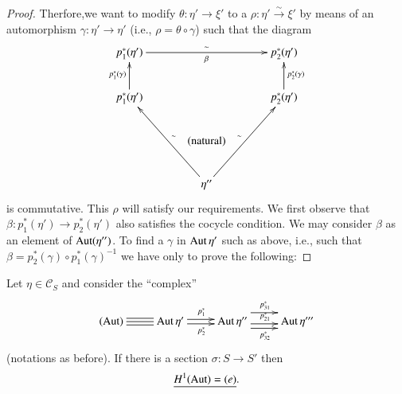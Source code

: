 \begin{proof}
Therfore,\pageoriginale we want to modify $\theta:\eta'\to \xi'$ to a
$\rho:\eta'\xrightarrow{\sim} \xi'$ by means of an automorphism $\gamma:\eta'\to
\eta'$ (i.e., $\rho=\theta\circ\gamma$) such that the diagram
\[
\xymatrix@C=1.2cm{
p^{\ast}_{1}(\eta')\ar[rr]^{\sim}_{\beta} & & p^{\ast}_{2}(\eta')\\
p^{\ast}_{1}(\eta')\ar[u]^{p^{\ast}_{1}(\gamma)} & &
p^{\ast}_{2}(\eta')\ar[u]_{p^{\ast}_{2}(\gamma)}\\
 & \text{(natural)} & \\
 & \eta''\ar[uul]_{\sim}\ar[uur]^{\sim} &
}
\]
is commutative. This $\rho$ will satisfy our requirements. We first
observe that $\beta:p^{\ast}_{1}(\eta')\to p^{\ast}_{2}(\eta')$ also
satisfies the cocycle condition. We may consider $\beta$ as an element
of $\operatorname{Aut} (\eta'')$. To find a $\gamma$ in $\operatorname{Aut}\eta'$ such as above,
i.e., such that $\beta=p^{\ast}_{2}(\gamma)\circ
p^{\ast}_{1}(\gamma)^{-1}$ we have only to prove the following:
\end{proof}

\begin{lemma}\label{lem7.1.3}
Let $\eta\in\mathscr{C}_{S}$ and consider the ``complex''
\[
\xymatrix{
(\Aut)\ar@{-}@<.3em>[r]\ar@{-}[r]\ar@{-}@<-.3em>[r] & \Aut\eta'
  \ar@<.2em>[r]^{p^{\ast}_{1}}\ar@<-.2em>[r]_{p^{\ast}_{2}} & \Aut
  \eta''
\ar@<.8em>[r]^{p^{\ast}_{31}}\ar@<-.2em>[r]^{p^{\ast}_{21}}\ar@<-.6em>[r]_{p^{\ast}_{32}}
& \Aut \eta'''
}
\]
(notations as before). If there is a section $\sigma:S\to S'$ then 
$$
\underline{H^{1}(\operatorname{Aut})=(e)}.
$$
\end{lemma}

